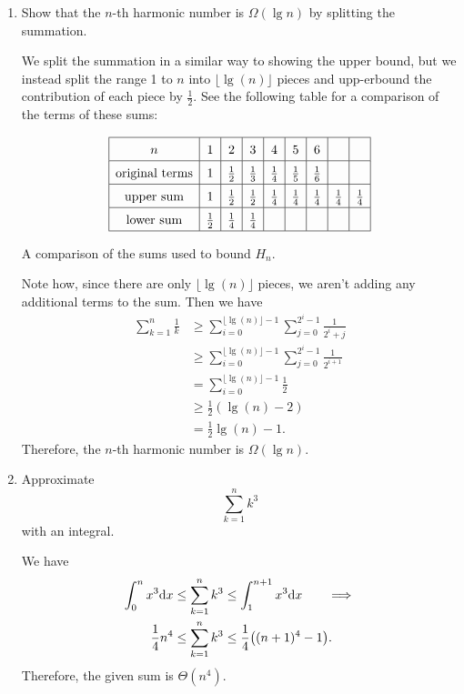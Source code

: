 \documentclass[AppendixA]{subfiles}
\begin{document}
\begin{enumerate}
		\item Show that the $n$-th harmonic number is $\Omega(\lg n)$ by splitting the summation.
		\begin{answer}
			We split the summation in a similar way to showing the upper bound, but we instead split the range 1 to $n$ into $\lfloor \lg(n) \rfloor$ pieces and upp-erbound the contribution of each piece by $\frac{1}{2}$. See the following table for a comparison of the terms of these sums:
			\begin{table}[H]
				\[
					\renewcommand{\arraystretch}{1.5}
					\begin{array}{|c|c|c|c|c|c|c|c|c|}
						\hline
						n & 1 & 2 & 3 & 4 & 5 & 6 & & \\\hline
						\text{original terms} & 1 & \frac{1}{2} & \frac{1}{3} & \frac{1}{4} & \frac{1}{5} & \frac{1}{6} & & \\\hline
						\text{upper sum} & 1 & \frac{1}{2} & \frac{1}{2} & \frac{1}{4} & \frac{1}{4} & \frac{1}{4} & \frac{1}{4} & \frac{1}{4} \\\hline
						\text{lower sum} & \frac{1}{2} & \frac{1}{4} & \frac{1}{4} & & & & &\\\hline
					\end{array}
				\]
				\caption{A comparison of the sums used to bound $H_n$.}
			\end{table}

			Note how, since there are only $\lfloor \lg(n) \rfloor$ pieces, we aren't adding any additional terms to the sum. Then we have
			\begin{align*}
				\sum_{k = 1}^n \frac{1}{k} &\geq \sum_{i = 0}^{\lfloor \lg(n) \rfloor - 1} \sum_{j = 0}^{2^i - 1} \frac{1}{2^i + j}\\
					&\geq \sum_{i = 0}^{\lfloor \lg(n) \rfloor - 1} \sum_{j = 0}^{2^i - 1} \frac{1}{2^{i + 1}}\\
					&= \sum_{i = 0}^{\lfloor \lg(n) \rfloor - 1} \frac{1}{2}\\
					&\geq \frac{1}{2}(\lg(n) - 2)\\
					&= \frac{1}{2} \lg(n) - 1.
			\end{align*}
			Therefore, the $n$-th harmonic number is $\Omega(\lg n)$.
		\end{answer}
		
		\item Approximate
		\[
			\sum_{k = 1}^n k^3
		\]
		with an integral.
		\begin{answer}
			We have
			\begin{align*}
				\int_0^n x^3 \dd x &\leq \sum_{k = 1}^n k^3 \leq \int_1^{n+1} x^3 \dd x \tag*{$\implies$}\\
				\frac{1}{4}n^4     &\leq \sum_{k = 1}^n k^3 \leq \frac{1}{4}\qty((n+1)^4 - 1).
			\end{align*}
			Therefore, the given sum is $\Theta(n^4)$.
		\end{answer}
		

\end{enumerate}
\end{document}
